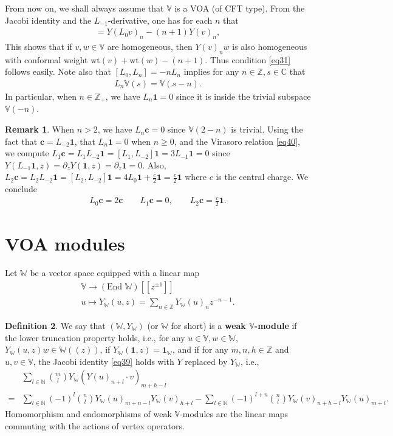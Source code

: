 \documentclass[12pt,a4paper,notitlepage]{report}
\theoremstyle{definition}
\newtheorem{df}{Definition}[section]
\newtheorem{rem}[df]{Remark}
\theoremstyle{plain}
\newcommand{\id}{\mathbf{1}}
\newcommand{\mbb}{\mathbb}
\newcommand{\Vbb}{\mathbb V}
\newcommand{\Wbb}{\mathbb W}
\newcommand{\Cbb}{\mathbb C}
\newcommand{\Zbb}{\mathbb Z}
\newcommand{\cbf}{\mathbf c}
\newcommand{\wt}{\mathrm{wt}}
\numberwithin{equation}{section}
\begin{document}
From now on, we shall always assume that $\Vbb$ is a VOA (of CFT type). From the Jacobi identity and the $L_{-1}$-derivative, one has for each $n$ that
\begin{align*}
[L_0,Y(v)_n]=Y(L_0 v)_n-(n+1)Y(v)_n,
\end{align*}
This shows that if $v,w\in\mbb V$ are homogeneous, then $Y(v)_nw$ is also homogeneous with conformal weight $\wt(v)+\wt(w)-(n+1)$. Thus condition \eqref{eq31} follows easily. Note also that $[L_0,L_n]=-nL_n$ implies for any $n\in\mbb Z,s\in\Cbb$ that
\begin{align}
L_n\Vbb(s)=\Vbb(s-n).
\end{align}
In particular, when $n\in\Zbb_+$, we have $L_n\id=0$ since it is inside the trivial subspace $\Vbb(-n)$.

\begin{rem}\label{lb58}
When $n>2$, we have $L_n\cbf=0$ since $\Vbb(2-n)$ is trivial. Using the fact that $\cbf=L_{-2}\id$, that $L_n\id=0$ when $n\geq0$,  and the Virasoro relation \eqref{eq40}, we compute $L_1\cbf=L_1L_{-2}\id=[L_1,L_{-2}]\id=3L_{-1}\id=0$ since $Y(L_{-1}\id,z)=\partial_zY(\id,z)=\partial_z\id=0$. Also, $L_2\cbf=L_2L_{-2}\id=[L_2,L_{-2}]\id=4L_0\id+\frac c 2\id=\frac c 2\id$ where $c$ is the central charge. We conclude
\begin{gather*}
L_0\cbf=2\cbf\qquad L_1\cbf=0,\qquad L_2\cbf=\frac c2 \id.
\end{gather*}
\end{rem}





\section{VOA modules}



Let $\Wbb$ be a vector space equipped with a linear map
\begin{gather}
\Vbb\rightarrow(\text{End }\Wbb)[[z^{\pm1}]]\nonumber\\
u\mapsto Y_\Wbb(u,z)=\sum_{n\in\mathbb Z}Y_\Wbb(u)_n z^{-n-1}.\label{eq51}
\end{gather}



\begin{df}
We say that $(\Wbb,Y_\Wbb)$ \index{Y@$Y,Y_\Wbb$} (or $\Wbb$ for short) is a \textbf{weak $\Vbb$-module} if the lower truncation property holds, i.e., for any $u\in\Vbb,w\in\Wbb$, $Y_\Wbb(u,z)w\in\Wbb((z))$, if $Y_\Wbb(\id,z)=\id_\Wbb$, and if for any $m,n,h\in\mbb Z$ and $u,v\in\Vbb$, the Jacobi identity \eqref{eq39} holds with $Y$ replaced by $Y_\Wbb$, i.e.,
\begin{align}
&\sum_{l\in\mathbb N}{m\choose l}Y_\Wbb(Y(u)_{n+l}\cdot v)_{m+h-l}\nonumber\\
=&\sum_{l\in\mathbb N}(-1)^l{n\choose l}Y_\Wbb(u)_{m+n-l}Y_\Wbb(v)_{h+l}-\sum_{l\in\mathbb N}(-1)^{l+n}{n\choose l}Y_\Wbb(v)_{n+h-l}Y_\Wbb(u)_{m+l}.\label{eq192}
\end{align}
Homomorphism and endomorphisms of weak $\Vbb$-modules are the linear maps commuting with the actions of vertex operators.
\end{df}
\end{document}
